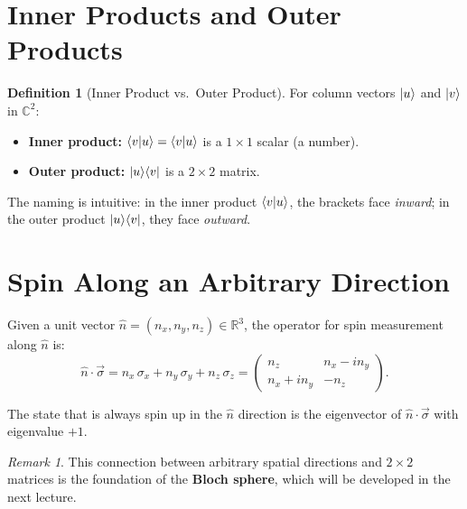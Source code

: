 \documentclass[11pt,a4paper]{article}
\theoremstyle{definition}
\newtheorem{definition}{Definition}[section]
\theoremstyle{plain}
\theoremstyle{remark}
\newtheorem{remark}{Remark}[section]
\begin{document}
\section{Inner Products and Outer Products}

\begin{definition}[Inner Product vs.\ Outer Product]
    For column vectors $\ket{u}$ and $\ket{v}$ in $\mathbb{C}^2$:
    \begin{itemize}
        \item \textbf{Inner product:} $\braket{v}{u} = \bra{v}\ket{u}$ is a $1 \times 1$ scalar (a number).
        \item \textbf{Outer product:} $\ket{u}\!\bra{v}$ is a $2 \times 2$ matrix.
    \end{itemize}
\end{definition}

The naming is intuitive: in the inner product $\bra{v}\ket{u}$, the brackets face \emph{inward}; in the outer product $\ket{u}\!\bra{v}$, they face \emph{outward}.

\section{Spin Along an Arbitrary Direction}

Given a unit vector $\hat{n} = (n_x, n_y, n_z) \in \mathbb{R}^3$, the operator for spin measurement along $\hat{n}$ is:
\[
    \hat{n} \cdot \vec{\sigma} = n_x\,\sigma_x + n_y\,\sigma_y + n_z\,\sigma_z = \begin{pmatrix} n_z & n_x - in_y \\ n_x + in_y & -n_z \end{pmatrix}.
\]

The state that is always spin up in the $\hat{n}$ direction is the eigenvector of $\hat{n}\cdot\vec{\sigma}$ with eigenvalue $+1$.

\begin{remark}
    This connection between arbitrary spatial directions and $2\times 2$ matrices is the foundation of the \textbf{Bloch sphere}, which will be developed in the next lecture.
\end{remark}
\end{document}
